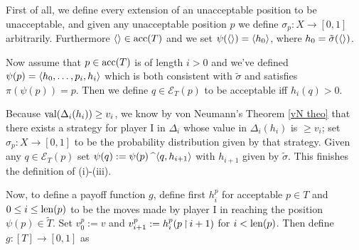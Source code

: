 First of all, we define every extension of an unacceptable position to be unacceptable, and given any unacceptable position $p$ we define $\sigma_p:X\to [0,1]$ arbitrarily. Furthermore $\langle \rangle\in\operatorname{\text{acc}}(T)$ and we set $\psi(\langle \rangle)=\langle h_0\rangle$, where $h_0=\tilde\sigma(\langle \rangle)$.

\qquad Now assume that $p\in\operatorname{\text{acc}}(T)$ is of length $i>0$ and we've defined $\psi(p)=\langle h_0,\hdots,p_i,h_i\rangle$ which is both consistent with $\tilde\sigma$ and satisfies $\pi(\psi(p))=p$. Then we define $q\in\mathcal{E}_T(p)$ to be acceptable iff $h_i(q)>0$.

\qquad Because $\operatorname{val}(\Delta_i(h_i))\geq v_i$, we know by von Neumann's Theorem \ref{vN theo} that there exists a strategy for player I in $\Delta_i$ whose value in $\Delta_i(h_i)$ is $\geq v_i$; set $\sigma_p:X\to[0,1]$ to be the probability distribution given by that strategy. Given any $q\in\mathcal{E}_T(p)$ set $\psi(q):=\psi(p)\operatorname{\text{\textasciicircum}}\langle q,h_{i+1}\rangle$ with $h_{i+1}$ given by $\tilde\sigma$. This finishes the definition of (i)-(iii).

\qquad Now, to define a payoff function $g$, define first $h_i^p$ for acceptable $p\in T$ and $0\leq i\leq\operatorname{len}(p)$ to be the moves made by player I in reaching the position $\psi(p)\in\tilde T$. Set $v_0^p:=v$ and $v_{i+1}^p:=h_i^p(p\operatorname{\upharpoonright} i+1)$ for $i<\operatorname{len}(p)$. Then define $g:[T]\to[0,1]$ as

\pagebreak
{}


